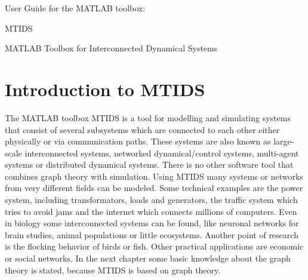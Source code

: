 \documentclass[12pt]{report}
\begin{document}
\begin{center}
{\LARGE User Guide for the MATLAB toolbox:} \\
\end{center}
\begin{center}
{\LARGE MTIDS} \\
\end{center}
\begin{center}
{\Large MATLAB Toolbox for Interconnected Dynamical Systems} \\
\end{center}
\chapter{Introduction to MTIDS}
The MATLAB toolbox MTIDS is a tool for modelling and simulating systems that consist of several subsystems which are connected to each other either physically or via communication paths. These systems are also known as large-scale interconnected systems, networked dynamical/control systems, multi-agent systems or distributed dynamical systems. There is no other software tool that combines graph theory with simulation.
Using MTIDS many systems or networks from very different fields can be modeled. Some technical examples are the power system, including transformators, loads and generators, the traffic system which tries to avoid jams and the internet which connects millions of computers.
Even in biology some interconnected systems can be found, like neuronal networks for brain studies, animal populations or little ecosystems. Another point of research is the flocking behavior of birds or fish.
Other practical applications are economic or social networks. In the next chapter some basic knowledge about the graph theory is stated, because MTIDS is based on graph theory.\\
\\
\newpage
\end{document}
